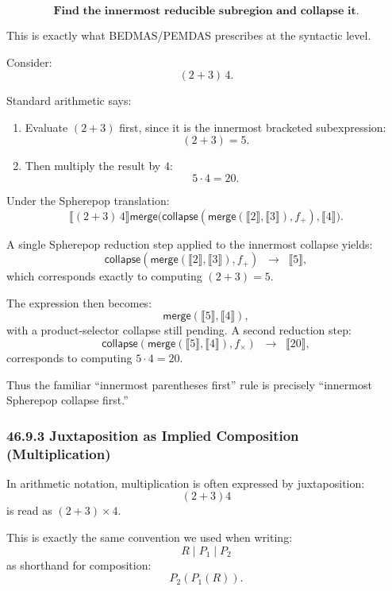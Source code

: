 \documentclass[12pt,letterpaper]{article}
\theoremstyle{remark}
\begin{document}
\[
\textbf{Find the innermost reducible subregion and collapse it.}
\]

This is exactly what BEDMAS/PEMDAS prescribes at the syntactic level.

Consider:
\[
(2 + 3)\,4.
\]

Standard arithmetic says:

\begin{enumerate}
  \item Evaluate $(2+3)$ first, since it is the innermost bracketed subexpression:
    \[
    (2+3) = 5.
    \]
  \item Then multiply the result by $4$:
    \[
    5 \cdot 4 = 20.
    \]
\end{enumerate}

Under the Spherepop translation:
\[
\llbracket (2 + 3)\,4 \rrbracket
\mathsf{merge}\big(
  \mathsf{collapse}(\mathsf{merge}(\llbracket 2 \rrbracket,\llbracket 3 \rrbracket), f_+),
  \llbracket 4 \rrbracket
\big).
\]

A single Spherepop reduction step applied to the innermost collapse yields:
\[
\mathsf{collapse}(\mathsf{merge}(\llbracket 2 \rrbracket,\llbracket 3 \rrbracket), f_+)
\;\;\longrightarrow\;\;
\llbracket 5 \rrbracket,
\]
which corresponds exactly to computing $(2+3) = 5$.

The expression then becomes:
\[
\mathsf{merge}(\llbracket 5 \rrbracket, \llbracket 4 \rrbracket),
\]
with a product-selector collapse still pending. A second reduction step:
\[
\mathsf{collapse}(\mathsf{merge}(\llbracket 5 \rrbracket, \llbracket 4 \rrbracket), f_{\times})
\;\;\longrightarrow\;\;
\llbracket 20 \rrbracket,
\]
corresponds to computing $5 \cdot 4 = 20$.

Thus the familiar “innermost parentheses first” rule is precisely 
“innermost Spherepop collapse first.”

\subsubsection*{46.9.3 Juxtaposition as Implied Composition (Multiplication)}

In arithmetic notation, multiplication is often expressed by juxtaposition:
\[
(2 + 3)4
\]
is read as $(2+3)\times 4$.

This is exactly the same convention we used when writing:
\[
R \mid P_1 \mid P_2
\]
as shorthand for composition:
\[
P_2(P_1(R)).
\]
\end{document}
